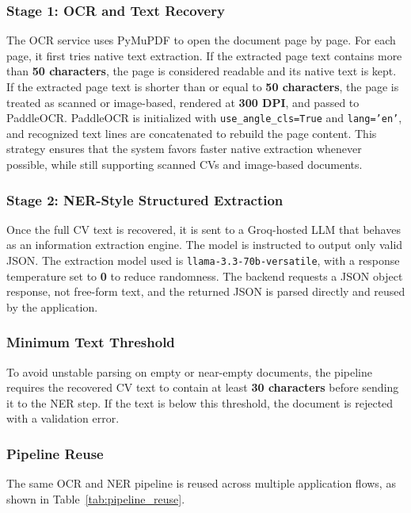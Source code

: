 \subsubsection{Stage 1: OCR and Text Recovery}

The OCR service uses PyMuPDF to open the document page by page. For each page, it first tries native text extraction. If the extracted page text contains more than \textbf{50 characters}, the page is considered readable and its native text is kept. If the extracted page text is shorter than or equal to \textbf{50 characters}, the page is treated as scanned or image-based, rendered at \textbf{300 DPI}, and passed to PaddleOCR. PaddleOCR is initialized with \texttt{use\_angle\_cls=True} and \texttt{lang='en'}, and recognized text lines are concatenated to rebuild the page content. This strategy ensures that the system favors faster native extraction whenever possible, while still supporting scanned CVs and image-based documents.

\subsubsection{Stage 2: NER-Style Structured Extraction}

Once the full CV text is recovered, it is sent to a Groq-hosted LLM that behaves as an information extraction engine. The model is instructed to output only valid JSON. The extraction model used is \texttt{llama-3.3-70b-versatile}, with a response temperature set to \textbf{0} to reduce randomness. The backend requests a JSON object response, not free-form text, and the returned JSON is parsed directly and reused by the application.

\subsubsection{Minimum Text Threshold}

To avoid unstable parsing on empty or near-empty documents, the pipeline requires the recovered CV text to contain at least \textbf{30 characters} before sending it to the NER step. If the text is below this threshold, the document is rejected with a validation error.

\subsubsection{Pipeline Reuse}

The same OCR and NER pipeline is reused across multiple application flows, as shown in Table~\ref{tab:pipeline_reuse}.

